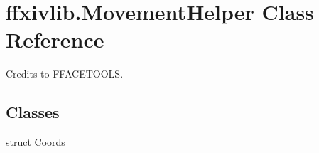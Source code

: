 \hypertarget{classffxivlib_1_1_movement_helper}{\section{ffxivlib.\-Movement\-Helper Class Reference}
\label{classffxivlib_1_1_movement_helper}
}


Credits to F\-F\-A\-C\-E\-T\-O\-O\-L\-S.  


\subsection*{Classes}
\begin{DoxyCompactItemize}
\item 
struct \hyperlink{structffxivlib_1_1_movement_helper_1_1_coords}{Coords}
\end{DoxyCompactItemize}
